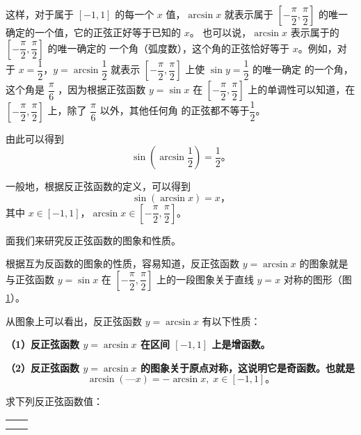 这样，对于属于 $[-1, 1]$ 的每一个 $x$ 值，$\arcsin x$ 就表示属于
$\left[ -\dfrac{\pi}{2}, \dfrac{\pi}{2} \right]$ \jiange 的唯一确定的一个值，它的正弦正好等于已知的 $x$。
也可以说，$\arcsin x$ 表示属于的 $\left[ -\dfrac{\pi}{2}, \dfrac{\pi}{2} \right]$ \jiange 的唯一确定的
一个角（弧度数），这个角的正弦恰好等于 $x$。例如，对于 $x = \dfrac{1}{2}$，$y = \arcsin \dfrac{1}{2}$ \jiange
就表示 $\left[ -\dfrac{\pi}{2}, \dfrac{\pi}{2} \right]$ 上使 $\sin y = \dfrac{1}{2}$ 的唯一确定
的一个角，这个角是 $\dfrac{\pi}{6}$ \jiange ，因为根据正弦函数 $y = \sin x$ 在
$\left[ -\dfrac{\pi}{2}, \dfrac{\pi}{2} \right]$ 上的单调性可以知道，在
$\left[ -\dfrac{\pi}{2}, \dfrac{\pi}{2} \right]$ 上，除了 $\dfrac{\pi}{6}$ 以外，其他任何角
的正弦都不等于$\dfrac{1}{2}$。\jiange

由此可以得到
$$\sin\left( \arcsin \dfrac{1}{2} \right) = \dfrac{1}{2} \text{。}$$

一般地，根据反正弦函数的定义，可以得到
$$\sin(\arcsin x) = x \text{，}$$
其中 $x \in [-1, 1]$，$\arcsin x \in \left[ -\dfrac{\pi}{2}, \dfrac{\pi}{2} \right]$。\jiange

面我们来研究反正弦函数的图象和性质。

根据互为反函数的图象的性质，容易知道，反正弦函数 $y = \arcsin x$ 的图象就是与正弦函数 $y = \sin x$
在 $\left[ -\dfrac{\pi}{2}, \dfrac{\pi}{2} \right]$ 上的一段图象关于直线 $y = x$ 对称的图形（图\ref{fig:1-3}）。

\begin{figure}[htbp]
    \centering
    
    \caption{}\label{fig:1-3}
\end{figure}

从图象上可以看出，反正弦函数 $y = \arcsin x$ 有以下性质：

\textbf{（1）反正弦函数 $y = \arcsin x$ 在区间 $[-1, 1]$ 上是增函数。}

\textbf{（2）反正弦函数 $y = \arcsin x$ 的图象关于原点对称，这说明它是奇函数。也就是
$$\arcsin(—x) = -\arcsin x, \; x \in [-1, 1] \text{。}$$}

\liti 求下列反正弦函数值：
\begin{xiaoxiaotis}

    \renewcommand\arraystretch{1.8}
    \begin{tabular}[t]{*{2}{@{}p{16em}}}
         &  \\
         & 
    \end{tabular}

\end{xiaoxiaotis}

